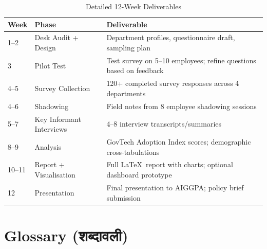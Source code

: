\documentclass[12pt,a4paper]{article}
\newcommand{\hindi}[1]{{\hindifont #1}}
\begin{document}
\begin{table}[H]
\centering
\caption{Detailed 12-Week Deliverables}
\label{tab:timeline_detail}
\begin{tabularx}{\textwidth}{@{}llX@{}}
\toprule
\textbf{Week} & \textbf{Phase} & \textbf{Deliverable} \\
\midrule
1--2 & Desk Audit + Design & Department profiles, questionnaire draft, sampling plan \\
3 & Pilot Test & Test survey on 5--10 employees; refine questions based on feedback \\
4--5 & Survey Collection & 120+ completed survey responses across 4 departments \\
4--6 & Shadowing & Field notes from 8 employee shadowing sessions \\
5--7 & Key Informant Interviews & 4--8 interview transcripts/summaries \\
8--9 & Analysis & GovTech Adoption Index scores; demographic cross-tabulations \\
10--11 & Report + Visualisation & Full \LaTeX\ report with charts; optional dashboard prototype \\
12 & Presentation & Final presentation to AIGGPA; policy brief submission \\
\bottomrule
\end{tabularx}
\end{table}

\section{Glossary (\hindi{शब्दावली})}
\end{document}
